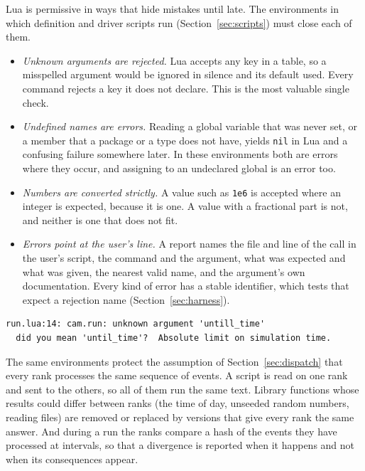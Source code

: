 \documentclass[11pt,a4paper]{article}
\newcommand{\code}[1]{\texttt{#1}}
\begin{document}
Lua is permissive in ways that hide mistakes until late.  The environments
in which definition and driver scripts run (Section~\ref{sec:scripts}) must
close each of them.

\begin{itemize}
  \item \emph{Unknown arguments are rejected.}  Lua accepts any key in a
        table, so a misspelled argument would be ignored in silence and its
        default used.  Every command rejects a key it does not declare.
        This is the most valuable single check.
  \item \emph{Undefined names are errors.}  Reading a global variable that
        was never set, or a member that a package or a type does not have,
        yields \code{nil} in Lua and a confusing failure somewhere later.
        In these environments both are errors where they occur, and
        assigning to an undeclared global is an error too.
  \item \emph{Numbers are converted strictly.}  A value such as \code{1e6}
        is accepted where an integer is expected, because it is one.  A
        value with a fractional part is not, and neither is one that does
        not fit.
  \item \emph{Errors point at the user's line.}  A report names the file and
        line of the call in the user's script, the command and the argument,
        what was expected and what was given, the nearest valid name, and
        the argument's own documentation.  Every kind of error has a stable
        identifier, which tests that expect a rejection name
        (Section~\ref{sec:harness}).
\end{itemize}

\begin{lstlisting}
run.lua:14: cam.run: unknown argument 'untill_time'
  did you mean 'until_time'?  Absolute limit on simulation time.
\end{lstlisting}

The same environments protect the assumption of Section~\ref{sec:dispatch}
that every rank processes the same sequence of events.  A script is read on
one rank and sent to the others, so all of them run the same text.  Library
functions whose results could differ between ranks (the time of day,
unseeded random numbers, reading files) are removed or replaced by versions
that give every rank the same answer.  And during a run the ranks compare a
hash of the events they have processed at intervals, so that a divergence
is reported when it happens and not when its consequences appear.
\end{document}

